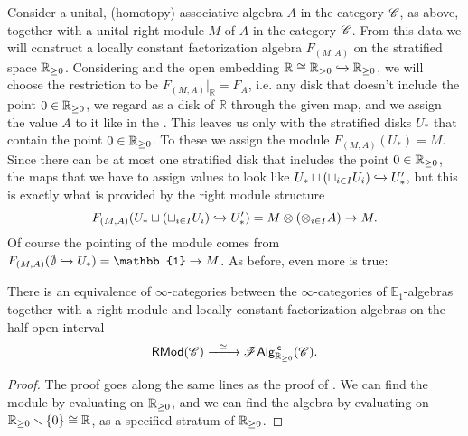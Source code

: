 \documentclass[../text.tex]{subfiles}
\begin{document}
\begin{construction}\label{con:lcfas_on_hoint}
    Consider a unital, (homotopy) associative algebra $A$ in the category $\mathscr{C}$, as above, together with a unital right module $M$ of $A$ in the category $\mathscr{C}$. From this data we will construct a locally constant factorization algebra $F_{(M, A)}$ on the stratified space $\mathbb{R}_{\geq 0}$. Considering  and the open embedding $\mathbb{R} \cong \mathbb{R}_{>0} \xhookrightarrow{} \mathbb{R}_{\geq 0}$, we will choose the restriction to be $F_{(M,A)}|_{\mathbb{R}} = F_A$, i.e. any disk that doesn't include the point $0 \in \mathbb{R}_{\geq 0}$, we regard as a disk of $\mathbb{R}$ through the given map, and we assign the value $A$ to it like in the . This leaves us only with the stratified disks $U_*$ that contain the point $0 \in \mathbb{R}_{\geq 0}$. To these we assign the module $F_{(M,A)}(U_*) = M$. Since there can be at most one stratified disk that includes the point $0 \in \mathbb{R}_{\geq 0}$, the maps that we have to assign values to look like $U_* \sqcup (\sqcup_{i \in I} U_i) \xhookrightarrow{} U'_*$, but this is exactly what is provided by the right module structure
    \begin{equation}
        F_{(M,A)} (U_* \sqcup (\sqcup_{i \in I} U_i) \xhookrightarrow{} U'_*) = M \otimes (\otimes_{i \in I} A) \rightarrow M.
    \end{equation}
    Of course the pointing of the module comes from $F_{(M,A)}(\emptyset \xhookrightarrow{} U_*) = \mathbb{1} \rightarrow M$. As before, even more is true:
\end{construction}

\begin{proposition}\label{prop:hoint_gives_modules}
    There is an equivalence of $\infty$-categories between the $\infty$-categories of $\mathbb{E}_1$-algebras together with a right module and locally constant factorization algebras on the half-open interval
    \begin{equation}
        \mathsf{RMod}(\catC) \xrightarrow{\ \ \simeq \ \ } \lcfa_{\hoint} (\catC).
    \end{equation}
\end{proposition}

\begin{proof}
    The proof goes along the same lines as the proof of . We can find the module by evaluating on $\mathbb{R}_{\geq 0}$, and we can find the algebra by evaluating on $\mathbb{R}_{\geq 0} \smallsetminus \{ 0 \} \cong \mathbb{R}$, as a specified stratum of $\mathbb{R}_{\geq 0}$.
\end{proof}
\end{document}
